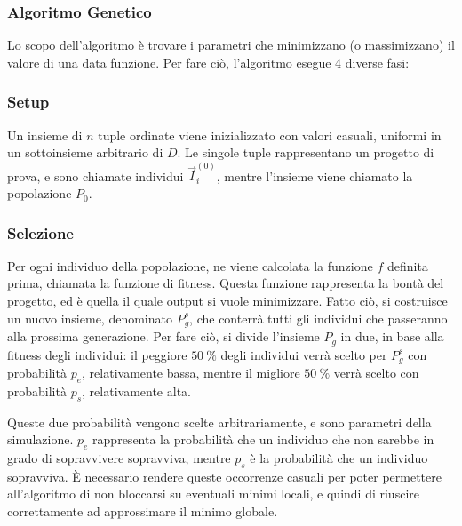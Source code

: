 \documentclass[fleqn,11pt]{SelfArx} %
\begin{document}
\subsubsection{Algoritmo Genetico}
Lo scopo dell'algoritmo è trovare i parametri che minimizzano (o massimizzano) il valore di una data funzione.
Per fare ciò, l'algoritmo esegue 4 diverse fasi: \\

\newcommand{\vI}{\vec{I}}

\subsubsection{Setup}
Un insieme di \(n\) tuple ordinate viene inizializzato con valori casuali, uniformi in un sottoinsieme arbitrario di \(D\).
Le singole tuple rappresentano un progetto di prova, e sono chiamate individui \(\vI^{(0)}_i\), mentre l'insieme viene chiamato la popolazione \(P_0\).

\subsubsection{Selezione}
Per ogni individuo della popolazione, ne viene calcolata la funzione \(f\) definita prima, chiamata la funzione di fitness.
Questa funzione rappresenta la bontà del progetto, ed è quella il quale output si vuole minimizzare.
Fatto ciò, si costruisce un nuovo insieme, denominato \(P^s_g\), che conterrà tutti gli individui che passeranno alla prossima generazione.
Per fare ciò, si divide l'insieme \(P_g\) in due, in base alla fitness degli individui: il peggiore \(\SI{50}{\percent}\) degli individui verrà scelto per \(P^s_g\) con probabilità \(p_e\), relativamente bassa, mentre il migliore \(\SI{50}{\percent}\) verrà scelto con probabilità \(p_s\), relativamente alta. 

Queste due probabilità vengono scelte arbitrariamente, e sono parametri della simulazione.
\(p_e\) rappresenta la probabilità che un individuo che non sarebbe in grado di sopravvivere sopravviva, mentre \(p_s\) è la probabilità che un individuo sopravviva.
È necessario rendere queste occorrenze casuali per poter permettere all'algoritmo di non bloccarsi su eventuali minimi locali, e quindi di riuscire correttamente ad approssimare il minimo globale.
\end{document}

